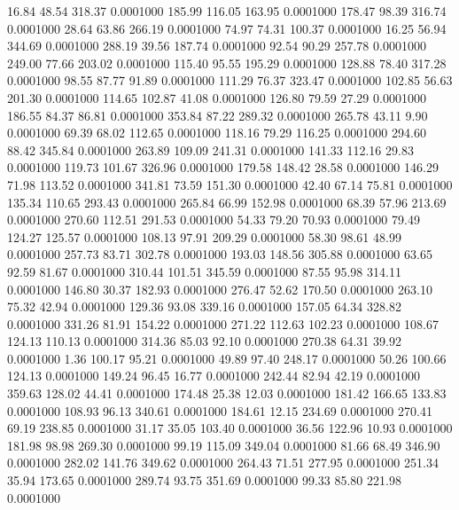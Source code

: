   16.84   48.54  318.37   0.0001000
 185.99  116.05  163.95   0.0001000
 178.47   98.39  316.74   0.0001000
  28.64   63.86  266.19   0.0001000
  74.97   74.31  100.37   0.0001000
  16.25   56.94  344.69   0.0001000
 288.19   39.56  187.74   0.0001000
  92.54   90.29  257.78   0.0001000
 249.00   77.66  203.02   0.0001000
 115.40   95.55  195.29   0.0001000
 128.88   78.40  317.28   0.0001000
  98.55   87.77   91.89   0.0001000
 111.29   76.37  323.47   0.0001000
 102.85   56.63  201.30   0.0001000
 114.65  102.87   41.08   0.0001000
 126.80   79.59   27.29   0.0001000
 186.55   84.37   86.81   0.0001000
 353.84   87.22  289.32   0.0001000
 265.78   43.11    9.90   0.0001000
  69.39   68.02  112.65   0.0001000
 118.16   79.29  116.25   0.0001000
 294.60   88.42  345.84   0.0001000
 263.89  109.09  241.31   0.0001000
 141.33  112.16   29.83   0.0001000
 119.73  101.67  326.96   0.0001000
 179.58  148.42   28.58   0.0001000
 146.29   71.98  113.52   0.0001000
 341.81   73.59  151.30   0.0001000
  42.40   67.14   75.81   0.0001000
 135.34  110.65  293.43   0.0001000
 265.84   66.99  152.98   0.0001000
  68.39   57.96  213.69   0.0001000
 270.60  112.51  291.53   0.0001000
  54.33   79.20   70.93   0.0001000
  79.49  124.27  125.57   0.0001000
 108.13   97.91  209.29   0.0001000
  58.30   98.61   48.99   0.0001000
 257.73   83.71  302.78   0.0001000
 193.03  148.56  305.88   0.0001000
  63.65   92.59   81.67   0.0001000
 310.44  101.51  345.59   0.0001000
  87.55   95.98  314.11   0.0001000
 146.80   30.37  182.93   0.0001000
 276.47   52.62  170.50   0.0001000
 263.10   75.32   42.94   0.0001000
 129.36   93.08  339.16   0.0001000
 157.05   64.34  328.82   0.0001000
 331.26   81.91  154.22   0.0001000
 271.22  112.63  102.23   0.0001000
 108.67  124.13  110.13   0.0001000
 314.36   85.03   92.10   0.0001000
 270.38   64.31   39.92   0.0001000
   1.36  100.17   95.21   0.0001000
  49.89   97.40  248.17   0.0001000
  50.26  100.66  124.13   0.0001000
 149.24   96.45   16.77   0.0001000
 242.44   82.94   42.19   0.0001000
 359.63  128.02   44.41   0.0001000
 174.48   25.38   12.03   0.0001000
 181.42  166.65  133.83   0.0001000
 108.93   96.13  340.61   0.0001000
 184.61   12.15  234.69   0.0001000
 270.41   69.19  238.85   0.0001000
  31.17   35.05  103.40   0.0001000
  36.56  122.96   10.93   0.0001000
 181.98   98.98  269.30   0.0001000
  99.19  115.09  349.04   0.0001000
  81.66   68.49  346.90   0.0001000
 282.02  141.76  349.62   0.0001000
 264.43   71.51  277.95   0.0001000
 251.34   35.94  173.65   0.0001000
 289.74   93.75  351.69   0.0001000
  99.33   85.80  221.98   0.0001000
